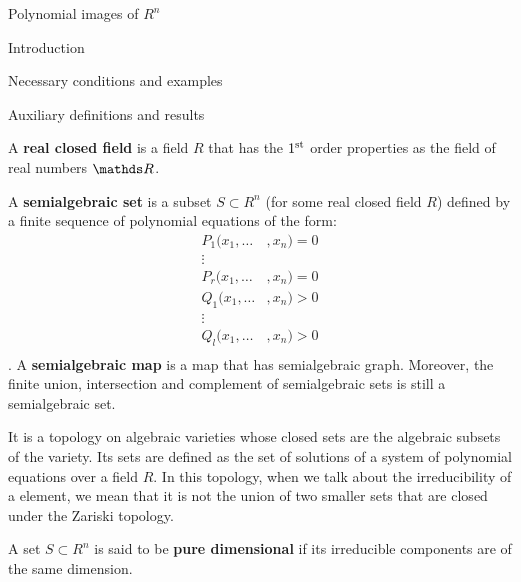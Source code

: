 \documentclass[11pt, a4paper, english, twoside, notitlepage]{report}
\begin{document}
\begin{chapter}{Polynomial images of $R^n$}
\begin{section}{Introduction}
\begin{subsection}{Necessary conditions and examples}
\begin{example}
\begin{enumerate}[(i)]
			
		\end{enumerate}
		
	\end{example}
	
	
	\end{subsection}
	
\end{section}

\end{chapter}


\appendix
\begin{chapter}{Auxiliary definitions and results}

\begin{definition}\label{realCField}
A \textbf{real closed field} is a field $R$ that has the $1\textsuperscript{st}$ order properties as the field of real numbers $\R$.
\end{definition}

\begin{definition}\label{semialgSet}
A \textbf{semialgebraic set} is a subset $S \subset R^n$ (for some real closed field $R$) defined by a finite sequence of polynomial equations of the form:
\begin{align*}
	P_1(x_1, \dots&, x_n) = 0\\
	\vdots &\\
	P_r(x_1, \dots&, x_n) = 0 \\
	Q_1(x_1, \dots&, x_n) > 0 \\
	\vdots &\\
	Q_l(x_1, \dots&, x_n) > 0 \\
\end{align*}
. A \textbf{semialgebraic map} is a map that has semialgebraic graph. Moreover, the finite union, intersection and complement of semialgebraic sets is still a semialgebraic set.
\end{definition}

\begin{definition}\label{zariski}
It is a topology on algebraic varieties whose closed sets are the algebraic subsets of the variety. Its sets are defined as the set of solutions of a system of polynomial equations over a field $R$. In this topology, when we talk about the irreducibility of a element, we mean that it is not the union of two smaller sets that are closed under the Zariski topology.
\end{definition}

\begin{definition}\label{pureDim}
A set $S \subset R^n$ is said to be \textbf{pure dimensional} if its irreducible components are of the same dimension.
\end{definition}


\end{chapter}
\end{document}
